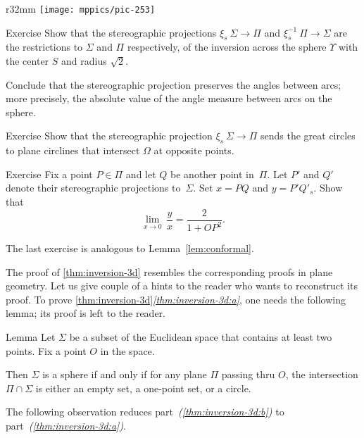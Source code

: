 {

\begin{wrapfigure}{r}{32mm}
\vskip-0mm
\centering
\texttt{[image: mppics/pic-253]}
\end{wrapfigure}

\begin{thm}{Exercise}\label{ex:stereographic-inversion}
Show that the stereographic projections 
$\xi_s\: \Sigma\to\Pi$ and $\xi^{-1}_s\: \Pi\to\Sigma$
are the restrictions to $\Sigma$ and $\Pi$ respectively, of the inversion across the sphere $\Upsilon$ with the center $S$ and radius $\sqrt{2}$.

Conclude that the stereographic projection preserves 
the angles between arcs;
more precisely, the absolute value of the angle measure between arcs on the sphere.
\end{thm}

\begin{thm}{Exercise}\label{ex:great-circ}
Show that the stereographic projection $\xi_s\:\Sigma\to\Pi$
sends the great circles to plane circlines that intersect $\Omega$ at opposite points.
\end{thm}

}

\begin{thm}{Exercise}\label{ex:conform-sphere}
Fix a point $P\in \Pi$  and let $Q$ be another point in~$\Pi$.
Let $P'$ and $Q'$ denote their stereographic projections to~$\Sigma$.
Set $x=PQ$ and $y=P'Q'_s$.
Show that
$$\lim_{x\to 0}\, \frac{y}{x}=\frac{2}{1+OP^2}.$$
\end{thm}

The last exercise is analogous to Lemma~\ref{lem:conformal}.

The proof of \ref{thm:inversion-3d} resembles the corresponding proofs in plane geometry.
Let us give couple of a hints to the reader who wants to reconstruct its proof.
To prove \ref{thm:inversion-3d}\textit{\ref{thm:inversion-3d:a}}, one needs the following lemma;
its proof is left to the reader.

\begin{thm}{Lemma}
Let $\Sigma$ be a subset of the Euclidean space
that contains at least two points.
Fix a point $O$ in the space.

Then $\Sigma$ is 
a sphere 
if and only if
for any plane $\Pi$ passing thru $O$,
the intersection $\Pi\cap \Sigma$ is either an empty set,
a one-point set, or a circle.
\end{thm}  

The following observation reduces part~\textit{(\ref{thm:inversion-3d:b})} to part~\textit{(\ref{thm:inversion-3d:a})}.

